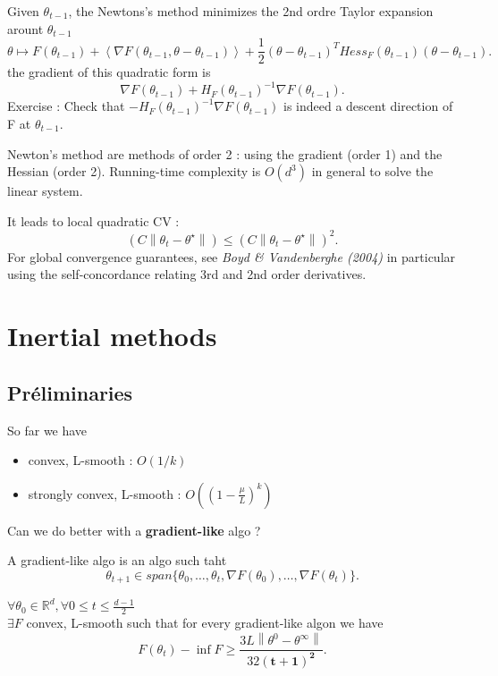 \begin{note}
    Given $ \theta _{t-1} $, the Newtons's method minimizes the 2nd ordre Taylor expansion arount $ \theta _{t-1} $ 
    \[
        \theta \mapsto F(\theta_{t-1}) + \left\langle \nabla F(\theta _{t-1}, \theta  - \theta _{t-1}) \right\rangle + \frac{1}{2} (\theta  - \theta _{t-1} )^T Hess_F(\theta _{t-1}) (\theta - \theta _{t-1})
    .\]
    the gradient of this quadratic form is 
    \[
        \nabla F(\theta _{t-1}) + H_F(\theta _{t-1})^{-1} \nabla F(\theta _{t-1})
    .\]
    Exercise : Check that $- H_F(\theta_{t-1})^{-1} \nabla F(\theta_{t-1})$ is indeed a descent direction of F at $\theta_{t-1}$.
    
    Newton's method are methods of order 2 : using the gradient (order 1) and the Hessian (order 2). Running-time complexity is $ O(d^3) $ in general to solve the linear system. 

    It leads to local quadratic CV : 
    \[
        (C \left\| \theta_t - \theta ^{\star}\right\| ) \leq (C \left\| \theta_t - \theta ^{\star}\right\| )^2
    .\]
    For global convergence guarantees, see  \textit{Boyd \& Vandenberghe (2004)} in particular using the self-concordance relating 3rd and 2nd order derivatives. 
\end{note}

\section{Inertial methods}

\subsection{Préliminaries}
So far we have \begin{itemize}
    \item convex, L-smooth : $ O(1/k) $ 
    \item strongly convex, L-smooth : $ O((1 - \frac{\mu }{L}) ^k ) $ 
\end{itemize}

Can we do better with a \textbf{gradient-like} algo ? 

\begin{defn}[]
    A gradient-like algo is an algo such taht 
    \[
        \theta _{t+1} \in span \{\theta _0, \dots, \theta _t, \nabla F(\theta _0), \dots, \nabla F(\theta _t)\}
    .\]
\end{defn}

\begin{thm}
    $\forall \theta_0 \in \mathbb{R}^d, \forall 0 \leq t \leq \frac{d-1}{2}$ \\
    $ \exists F $  convex, L-smooth such that for every gradient-like algon we have 
    \[
        F(\theta _t) - \inf F \geq \frac{3L \left\| \theta ^0 - \theta ^\infty  \right\| }{32 \mathbf{(t + 1)^2}}
    .\]
\end{thm}

